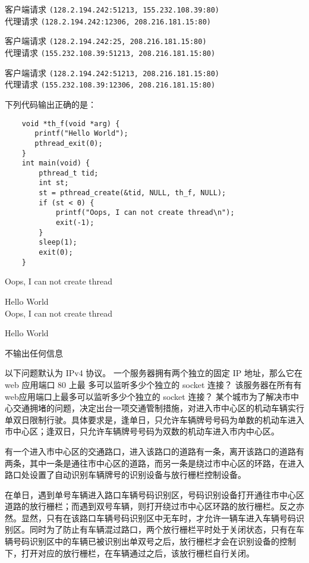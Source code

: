 \begin{problems}
\begin{choices}
            \item 客户端请求 \verb|(128.2.194.242:51213, 155.232.108.39:80)| \\ 代理请求 \verb|(128.2.194.242:12306, 208.216.181.15:80)|
            \item 客户端请求 \verb|(128.2.194.242:25, 208.216.181.15:80)| \\ 代理请求 \verb|(155.232.108.39:51213, 208.216.181.15:80)|
            \item 客户端请求 \verb|(128.2.194.242:51213, 208.216.181.15:80)| \\ 代理请求 \verb|(155.232.108.39:12306, 208.216.181.15:80)|
        \end{choices}
         下列代码输出正确的是：
        \begin{verbatim}
    void *th_f(void *arg) {
       printf("Hello World");
       pthread_exit(0);
    }
    int main(void) {
        pthread_t tid;
        int st;
        st = pthread_create(&tid, NULL, th_f, NULL);
        if (st < 0) {
            printf("Oops, I can not create thread\n");
            exit(-1);
        }
        sleep(1);
        exit(0);
    }
        \end{verbatim}
        \begin{choices}
            \item Oops, I can not create thread
            \item Hello World \\ Oops, I can not create thread
            \item Hello World
            \item 不输出任何信息
        \end{choices}
         以下问题默认为 IPv4 协议。
            \qn 一个服务器拥有两个独立的固定 IP 地址，那么它在 web 应用端口 80 上最 多可以监听多少个独立的 socket 连接？
            \qn 该服务器在所有有web应用端口上最多可以监听多少个独立的 socket 连接？
         某个城市为了解决市中心交通拥堵的问题，决定出台一项交通管制措施，对进入市中心区的机动车辆实行单双日限制行驶。具体要求是，逢单日，只允许车辆牌号号码为单数的机动车进入市中心区；逢双日，只允许车辆牌号号码为双数的机动车进入市内中心区。
        
        有一个进入市中心区的交通路口，进入该路口的道路有一条，离开该路口的道路有两条，其中一条是通往市中心区的道路，而另一条是绕过市中心区的环路，在进入路口处设置了自动识别车辆牌号的识别设备与放行栅栏控制设备。
        
        在单日，遇到单号车辆进入路口车辆号码识别区，号码识别设备打开通往市中心区道路的放行栅栏；而遇到双号车辆，则打开绕过市中心区环路的放行栅栏。反之亦然。显然，只有在该路口车辆号码识别区中无车时，才允许一辆车进入车辆号码识别区。同时为了防止有车辆混过路口，两个放行栅栏平时处于关闭状态，只有在车辆号码识别区中的车辆已被识别出单双号之后，放行栅栏才会在识别设备的控制下，打开对应的放行栅栏，在车辆通过之后，该放行栅栏自行关闭。


\end{problems}
